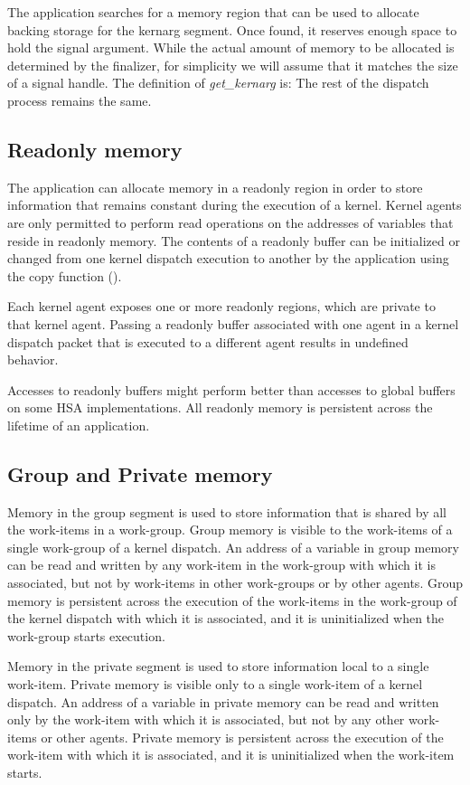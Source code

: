 \documentclass[final,oneside]{book}
\begin{document}
The application searches for a memory region that can be used to allocate
backing storage for the kernarg segment. Once found, it reserves enough space to
hold the signal argument. While the actual amount of memory to be allocated is
determined by the finalizer, for simplicity we will assume that it matches the
size of a signal handle.
The definition of \textit{get_kernarg} is:
The rest of the dispatch process remains the same.

\subsection{Readonly memory}
The application can allocate memory in a readonly region in order to store
information that remains constant during the execution of a kernel. Kernel
agents are only permitted to perform read operations on the addresses of
variables that reside in readonly memory.  The contents of a readonly buffer can
be initialized or changed from one kernel dispatch execution to another by the
application using the copy function ().

Each kernel agent exposes one or more readonly regions, which are private to
that kernel agent. Passing a readonly buffer associated with one agent in a
kernel dispatch packet that is executed to a different agent results in
undefined behavior.

Accesses to readonly buffers might perform better than accesses to global
buffers on some HSA implementations. All readonly memory is persistent across
the lifetime of an application.

\subsection{Group and Private memory}
Memory in the group segment is used to store information that is shared by all
the work-items in a work-group. Group memory is visible to the work-items of a
single work-group of a kernel dispatch. An address of a variable in group memory
can be read and written by any work-item in the work-group with which it is
associated, but not by work-items in other work-groups or by other agents. Group
memory is persistent across the execution of the work-items in the work-group of
the kernel dispatch with which it is associated, and it is uninitialized
when the work-group starts execution.

Memory in the private segment is used to store information local to a single
work-item. Private memory is visible only to a single work-item of a kernel
dispatch. An address of a variable in private memory can be read and written
only by the work-item with which it is associated, but not by any other
work-items or other agents.  Private memory is persistent across the execution
of the work-item with which it is associated, and it is uninitialized
when the work-item starts.
\end{document}
